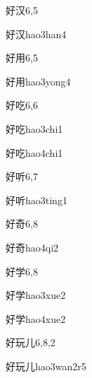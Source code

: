 \begin{entry}{好汉}{6,5}
  \begin{phonetics}{好汉}{hao3han4}
  \end{phonetics}
\end{entry}

\begin{entry}{好用}{6,5}
  \begin{phonetics}{好用}{hao3yong4}
  \end{phonetics}
\end{entry}

\begin{entry}{好吃}{6,6}
  \begin{phonetics}{好吃}{hao3chi1}
  \end{phonetics}
  \begin{phonetics}{好吃}{hao4chi1}
  \end{phonetics}
\end{entry}

\begin{entry}{好听}{6,7}
  \begin{phonetics}{好听}{hao3ting1}
  \end{phonetics}
\end{entry}

\begin{entry}{好奇}{6,8}
  \begin{phonetics}{好奇}{hao4qi2}
  \end{phonetics}
\end{entry}

\begin{entry}{好学}{6,8}
  \begin{phonetics}{好学}{hao3xue2}
  \end{phonetics}
  \begin{phonetics}{好学}{hao4xue2}
  \end{phonetics}
\end{entry}

\begin{entry}{好玩儿}{6,8,2}
  \begin{phonetics}{好玩儿}{hao3wan2r5}
  \end{phonetics}
\end{entry}

